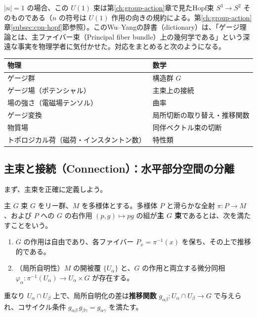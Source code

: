 \documentclass[uplatex, dvipdfmx, book]{jsbook}
\let\origsubsection\subsection
\let\origsubsubsection\subsubsection
\renewcommand{\section}{\origsubsection}
\renewcommand{\subsection}{\origsubsubsection}
\renewcommand{\subsubsection}{\paragraph}
\begin{document}
$|n| = 1$ の場合、この $U(1)$ 束は第\ref{ch:group-action}章で見たHopf束 $S^3 \to S^2$ そのものである（$n$ の符号は $U(1)$ 作用の向きの規約による。第\ref{ch:group-action}章\ref{subsec:cpn-hopf}節参照）。このWu--Yangの辞書（dictionary）は、「ゲージ理論とは、主ファイバー束（Principal fiber bundle）上の幾何学である」という深遠な事実を物理学者に気付かせた。対応をまとめると次のようになる。

\begin{center}
\begin{tabular}{ll}
    \hline
    物理 & 数学 \\
    \hline
    ゲージ群 & 構造群 $G$ \\
    ゲージ場（ポテンシャル） & 主束上の接続 \\
    場の強さ（電磁場テンソル） & 曲率 \\
    ゲージ変換 & 局所切断の取り替え・推移関数 \\
    物質場 & 同伴ベクトル束の切断 \\
    トポロジカル荷（磁荷・インスタントン数） & 特性類 \\
    \hline
\end{tabular}
\end{center}

\section{主束と接続（Connection）：水平部分空間の分離}

まず、主束を正確に定義しよう。

\begin{mydef}{主 $G$ 束}{}
$G$ をリー群、$M$ を多様体とする。多様体 $P$ と滑らかな全射 $\pi: P \to M$、および $P$ への $G$ の右作用 $(p, g) \mapsto p g$ の組が\textbf{主 $G$ 束}であるとは、次を満たすことをいう。
\begin{enumerate}
    \item $G$ の作用は自由であり、各ファイバー $P_x = \pi^{-1}(x)$ を保ち、その上で推移的である。
    \item （局所自明性）$M$ の開被覆 $\{U_\alpha\}$ と、$G$ の作用と両立する微分同相 $\varphi_\alpha: \pi^{-1}(U_\alpha) \to U_\alpha \times G$ が存在する。
\end{enumerate}
重なり $U_\alpha \cap U_\beta$ 上で、局所自明化の差は\textbf{推移関数} $g_{\alpha\beta}: U_\alpha \cap U_\beta \to G$ で与えられ、コサイクル条件 $g_{\alpha\beta}\, g_{\beta\gamma} = g_{\alpha\gamma}$ を満たす。
\end{mydef}
\end{document}
